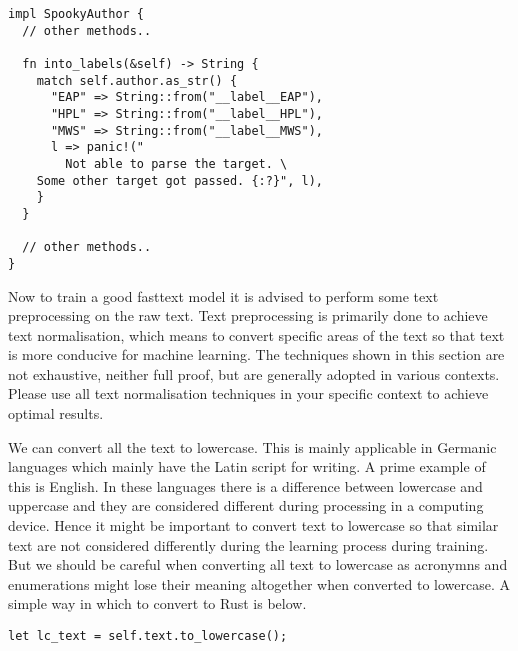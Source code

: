 \documentclass{book}
\begin{document}
\begin{lstlisting}[caption={chapter5\\/fasttext\\-model\\/src\\/main\\.rs}, basicstyle=\small]
impl SpookyAuthor {
  // other methods..

  fn into_labels(&self) -> String {
    match self.author.as_str() {
      "EAP" => String::from("__label__EAP"),
      "HPL" => String::from("__label__HPL"),
      "MWS" => String::from("__label__MWS"),
      l => panic!("
      	Not able to parse the target. \
	Some other target got passed. {:?}", l),
    }
  }

  // other methods..
}
\end{lstlisting}

Now to train a good fasttext model it is advised to perform some text preprocessing on the raw text. Text preprocessing is primarily done to achieve text normalisation, which means to convert specific areas of the text so that text is more conducive for machine learning. The techniques shown in this section are not exhaustive, neither full proof, but are generally adopted in various contexts. Please use all text normalisation techniques in your specific context to achieve optimal results.

We can convert all the text to lowercase. This is mainly applicable in Germanic languages which mainly have the Latin script for writing. A prime example of this is English. In these languages there is a difference between lowercase and uppercase and they are considered different during processing in a computing device. Hence it might be important to convert text to lowercase so that similar text are not considered differently during the learning process during training. But we should be careful when converting all text to lowercase as acronymns and enumerations might lose their meaning altogether when converted to lowercase. A simple way in which to convert to Rust is below.

\begin{lstlisting}[caption={chapter5\\/fasttext\\-model\\/src\\/main\\.rs}, basicstyle=\small]
let lc_text = self.text.to_lowercase();
\end{lstlisting}
\end{document}

